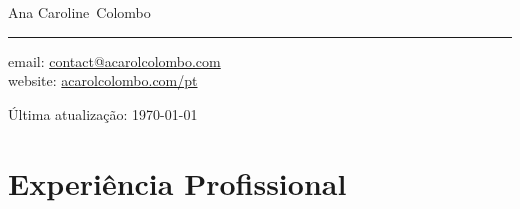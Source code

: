 \documentclass[11pt, a4paper]{article}
\makeatletter
\newcommand{\FirstName}{Ana Caroline}
\newcommand{\LastName}{Colombo}
\newcommand{\MyName}{\FirstName\ \LastName}
\newcommand{\Email}{contact@acarolcolombo.com}
\newcommand{\Website}{acarolcolombo.com/pt}
\makeatother
\begin{document}
\thispagestyle{empty}


{\fontsize{20pt}{0}\selectfont \MyName}	\\[0.3cm]
\rule{\textwidth}{0.2pt}
\begin{minipage}[t]{0.595\textwidth}
	 email: \href{mailto:\Email}{\Email}
    \\
    website: \href{https://www.\Website}{\Website}
\end{minipage}
\begin{minipage}[t]{0.405\textwidth}
  \begin{flushright}
  Última atualização: \monthyear\today
  \\
  \end{flushright}
\end{minipage}

\section*{Experiência Profissional}
\end{document}
